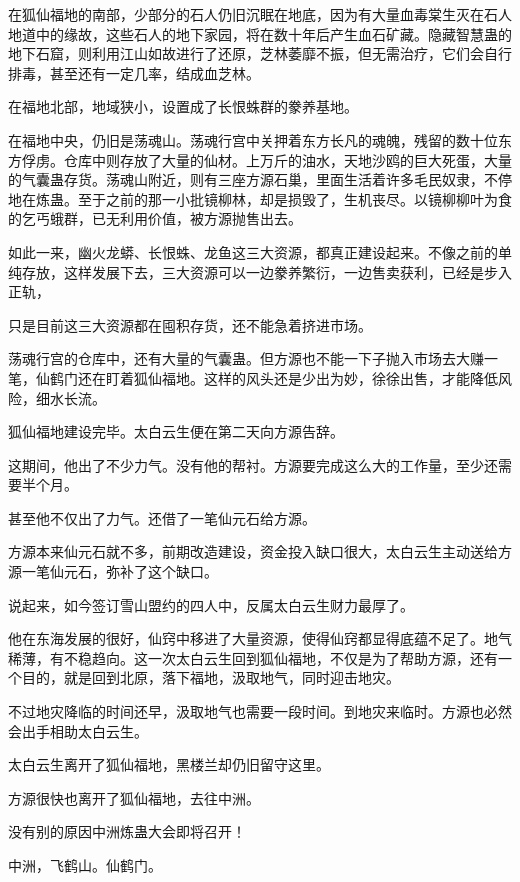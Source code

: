 
\begin{this_body}

在狐仙福地的南部，少部分的石人仍旧沉眠在地底，因为有大量血毒棠生灭在石人地道中的缘故，这些石人的地下家园，将在数十年后产生血石矿藏。隐藏智慧蛊的地下石窟，则利用江山如故进行了还原，芝林萎靡不振，但无需治疗，它们会自行排毒，甚至还有一定几率，结成血芝林。

在福地北部，地域狭小，设置成了长恨蛛群的豢养基地。

在福地中央，仍旧是荡魂山。荡魂行宫中关押着东方长凡的魂魄，残留的数十位东方俘虏。仓库中则存放了大量的仙材。上万斤的油水，天地沙鸥的巨大死蛋，大量的气囊蛊存货。荡魂山附近，则有三座方源石巢，里面生活着许多毛民奴隶，不停地在炼蛊。至于之前的那一小批镜柳林，却是损毁了，生机丧尽。以镜柳柳叶为食的乞丐蛾群，已无利用价值，被方源抛售出去。

如此一来，幽火龙蟒、长恨蛛、龙鱼这三大资源，都真正建设起来。不像之前的单纯存放，这样发展下去，三大资源可以一边豢养繁衍，一边售卖获利，已经是步入正轨，

只是目前这三大资源都在囤积存货，还不能急着挤进市场。

荡魂行宫的仓库中，还有大量的气囊蛊。但方源也不能一下子抛入市场去大赚一笔，仙鹤门还在盯着狐仙福地。这样的风头还是少出为妙，徐徐出售，才能降低风险，细水长流。

狐仙福地建设完毕。太白云生便在第二天向方源告辞。

这期间，他出了不少力气。没有他的帮衬。方源要完成这么大的工作量，至少还需要半个月。

甚至他不仅出了力气。还借了一笔仙元石给方源。

方源本来仙元石就不多，前期改造建设，资金投入缺口很大，太白云生主动送给方源一笔仙元石，弥补了这个缺口。

说起来，如今签订雪山盟约的四人中，反属太白云生财力最厚了。

他在东海发展的很好，仙窍中移进了大量资源，使得仙窍都显得底蕴不足了。地气稀薄，有不稳趋向。这一次太白云生回到狐仙福地，不仅是为了帮助方源，还有一个目的，就是回到北原，落下福地，汲取地气，同时迎击地灾。

不过地灾降临的时间还早，汲取地气也需要一段时间。到地灾来临时。方源也必然会出手相助太白云生。

太白云生离开了狐仙福地，黑楼兰却仍旧留守这里。

方源很快也离开了狐仙福地，去往中洲。

没有别的原因中洲炼蛊大会即将召开！

中洲，飞鹤山。仙鹤门。


\end{this_body}
